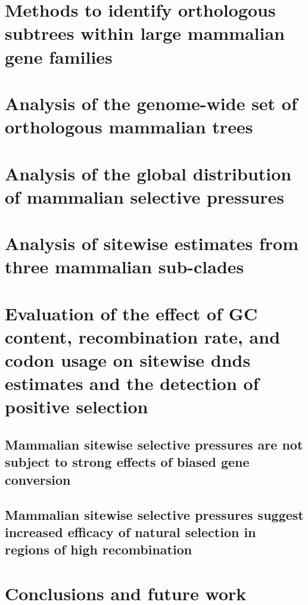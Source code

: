 \section{Methods to identify orthologous subtrees within large mammalian gene families}

\section{Analysis of the genome-wide set of orthologous mammalian trees}

\section{Analysis of the global distribution of mammalian selective pressures}

\section{Analysis of sitewise estimates from three mammalian sub-clades}

\section{Evaluation of the effect of GC content, recombination rate, and codon usage on sitewise dnds estimates and the detection of positive selection}

\subsection{Mammalian sitewise selective pressures are not subject to strong effects of biased gene conversion}

\subsection{Mammalian sitewise selective pressures suggest increased efficacy of natural selection in regions of high recombination}

\section{Conclusions and future work}
